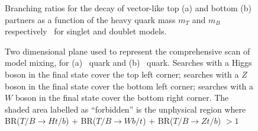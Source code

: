\begin{figure}[h!tb]\begin{center}
	\caption{Branching ratios for the decay of vector-like top (a) and bottom (b) partners as a function of the heavy quark mass $m_T$ and $m_B$ respectively~\cite{ATLAS-CONF-2013-056} for singlet and doublet models.\label{fig:vlqBRs}}
\end{center}\end{figure}

\begin{figure}[h!bt]\begin{center}
	\subfigure[]{
        }
	\subfigure[]{
        }
       	\caption{Two dimensional plane used to represent the comprehensive scan of model mixing, for (a) \T\ quark
        and (b) \B\ quark. Searches 
        with a Higgs boson in the final state cover the top left corner; searches with a $Z$ boson in the 
        final state cover the bottom left corner; searches with a $W$ boson in the final state cover the 
        bottom right corner. The shaded area labelled as ``forbidden'' is the unphysical region where
        BR($T/B\to Ht/b$) + BR($T/B\to Wb/t$) + BR($T/B\to  Zt/b$) $>1$ \label{fig:2dplane}}
\end{center}\end{figure}


